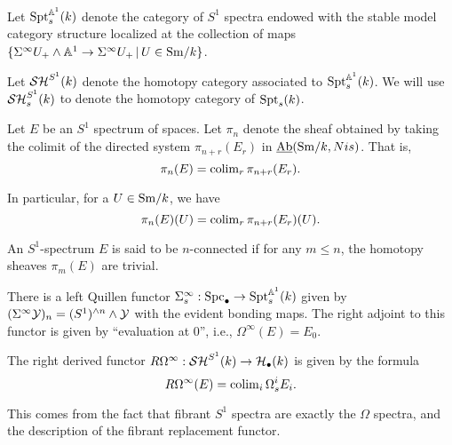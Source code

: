 \documentclass{amsart}%
\begin{document}
\begin{definition}
  Let $\mathrm{Spt}_s^{\mathbb{A}^1}(k)$ denote the category of $S^1$ spectra
  endowed with the stable model category structure localized at the
  collection of maps
  $\{\Sigma^{\infty} U_+ \wedge \mathbb{A}^1 \to \Sigma^{\infty}U_+ \, \vert \, U
  \in \mathrm{Sm}/k\}$. 

  Let $\mathcal{SH}^{S^1}(k)$ denote the homotopy category associated to
  $\mathrm{Spt}_s^{\mathbb{A}^1}(k)$. We will use $\mathcal{SH}_s^{S^1}(k)$ to denote the
  homotopy category of $\mathrm{Spt}_s(k)$.
\end{definition}

\begin{definition}
  Let $E$ be an $S^1$ spectrum of spaces. Let $\pi_n$
  denote the sheaf obtained by taking the colimit of the directed
  system $\pi_{n+r}(E_r)$ in $\operatorname{\underline{Ab}}(\mathrm{Sm}/k,Nis)$. That is,
  \begin{equation*}
    \pi_n(E) = \operatorname{colim}_{r} \pi_{n+r}(E_r). 
  \end{equation*}

  In particular, for a $U \in \mathrm{Sm}/k$, we have 
  \begin{equation*}
    \pi_n(E)(U) = \operatorname{colim}_{r} \pi_{n+r}(E_r)(U).
  \end{equation*}
\end{definition}

\begin{definition}
  An $S^1$-spectrum $E$ is said to be $n$-connected if for any
  $m\leq n$, the homotopy sheaves $\pi_m(E)$ are trivial. 
\end{definition}

\begin{definition}
  There is a left Quillen functor
  $\Sigma^{\infty}_s : \mathrm{Spc}_{\bullet} \to \mathrm{Spt}_s^{\mathbb{A}^1}(k)$ given by
  $(\Sigma^{\infty}\mathcal{Y})_n =(S^1)^{\wedge n} \wedge \mathcal{Y}$ with the
  evident bonding maps. The right adjoint to this functor is given by
  ``evaluation at $0$'', i.e., $\Omega^{\infty}(E) = E_0$.
\end{definition}

\begin{remark}
  The right derived functor
  $R\Omega^{\infty} : \mathcal{SH}^{S^1}(k) \to \mathcal{H}_{\bullet}(k)$ is given by
  the formula
  \begin{equation*}
    R\Omega^{\infty}(E) = \operatorname{colim}_i \Omega_s^{i}E_i.
  \end{equation*}

  This comes from the fact that fibrant $S^1$ spectra are exactly the
  $\Omega$ spectra, and the description of the fibrant replacement
  functor. 
\end{remark}
\end{document}
